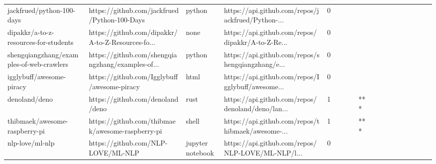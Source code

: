 \begin{tabular}{llllrlllllllllllll}
jackfrued/python-100-days                          &       https://github.com/jackfrued/Python-100-Days &            python &  https://api.github.com/repos/jackfrued/Python-... &       0 &         &        &           &                &                 &        &           &           &          &          &       &              &          \\
dipakkr/a-to-z-resources-for-students              &  https://github.com/dipakkr/A-to-Z-Resources-fo... &              none &  https://api.github.com/repos/dipakkr/A-to-Z-Re... &       0 &         &        &           &                &                 &        &           &           &          &          &       &              &          \\
shengqiangzhang/examples-of-web-crawlers           &  https://github.com/shengqiangzhang/examples-of... &            python &  https://api.github.com/repos/shengqiangzhang/e... &       0 &         &        &           &                &                 &        &           &           &          &          &       &              &          \\
igglybuff/awesome-piracy                           &        https://github.com/Igglybuff/awesome-piracy &              html &  https://api.github.com/repos/Igglybuff/awesome... &       0 &         &        &           &                &                 &        &           &           &          &          &       &              &          \\
denoland/deno                                      &                   https://github.com/denoland/deno &              rust &  https://api.github.com/repos/denoland/deno/lan... &       1 &         &        &           &            *** &                 &        &           &           &          &          &       &              &          \\
thibmaek/awesome-raspberry-pi                      &   https://github.com/thibmaek/awesome-raspberry-pi &             shell &  https://api.github.com/repos/thibmaek/awesome-... &       1 &         &        &           &            *** &                 &        &           &           &          &          &       &              &          \\
nlp-love/ml-nlp                                    &                 https://github.com/NLP-LOVE/ML-NLP &  jupyter notebook &  https://api.github.com/repos/NLP-LOVE/ML-NLP/l... &       0 &         &        &           &                &                 &        &           &           &          &          &       &              &          \\

\end{tabular}
